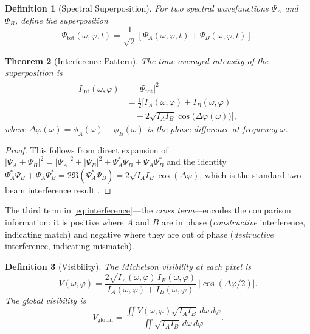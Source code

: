 \documentclass[11pt,twocolumn,a4paper]{article}
\newtheorem{theorem}{Theorem}[section]
\newtheorem{definition}[theorem]{Definition}
\begin{document}
\begin{definition}[Spectral Superposition]
\label{def:superposition}
For two spectral wavefunctions $\Psi_A$ and $\Psi_B$, define the
superposition
\begin{equation}
\label{eq:superposition}
  \Psi_{\text{tot}}(\omega, \varphi, t) = \frac{1}{\sqrt{2}}
    \left[ \Psi_A(\omega, \varphi, t) + \Psi_B(\omega, \varphi, t) \right].
\end{equation}
\end{definition}

\begin{theorem}[Interference Pattern]
\label{thm:interference}
The time-averaged intensity of the superposition is
\begin{align}
  I_{\text{int}}(\omega, \varphi) &=
    \overline{|\Psi_{\text{tot}}|^2} \nonumber \\
  &= \frac{1}{2}\bigl[I_A(\omega, \varphi)
    + I_B(\omega, \varphi) \nonumber \\
  &\quad + 2\sqrt{I_A I_B}
    \cos\bigl(\Delta\varphi(\omega)\bigr) \bigr],
    \label{eq:interference}
\end{align}
where $\Delta\varphi(\omega) = \phi_A(\omega) - \phi_B(\omega)$ is the
phase difference at frequency $\omega$.
\end{theorem}

\begin{proof}
This follows from direct expansion of
$|\Psi_A + \Psi_B|^2 = |\Psi_A|^2 + |\Psi_B|^2 + \Psi_A^*\Psi_B +
\Psi_A\Psi_B^*$ and the identity
$\Psi_A^*\Psi_B + \Psi_A\Psi_B^* = 2\Re(\Psi_A^*\Psi_B) =
2\sqrt{I_A I_B}\cos(\Delta\varphi)$, which is the standard two-beam
interference result \citep{young1804, born1999}.
\end{proof}

The third term in \eqref{eq:interference}---the \emph{cross term}---encodes
the comparison information: it is positive where $A$ and $B$ are in
phase (\emph{constructive} interference, indicating match) and negative
where they are out of phase (\emph{destructive} interference, indicating
mismatch).

\begin{definition}[Visibility]
\label{def:visibility}
The Michelson visibility \citep{michelson1890} at each pixel is
\begin{equation}
\label{eq:visibility}
  V(\omega, \varphi) = \frac{2\sqrt{I_A(\omega, \varphi) \,
    I_B(\omega, \varphi)}}{I_A(\omega, \varphi) +
    I_B(\omega, \varphi)} \, \bigl|\cos(\Delta\varphi / 2)\bigr|.
\end{equation}
The global visibility is
\begin{equation}
\label{eq:global_visibility}
  V_{\text{global}} = \frac{\iint V(\omega, \varphi) \sqrt{I_A I_B}
    \, d\omega \, d\varphi}
    {\iint \sqrt{I_A I_B} \, d\omega \, d\varphi}.
\end{equation}
\end{definition}
\end{document}
